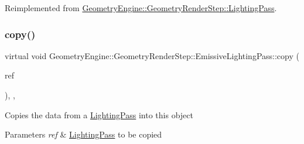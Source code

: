Reimplemented from \mbox{\hyperlink{class_geometry_engine_1_1_geometry_render_step_1_1_lighting_pass_a4f1cb36c7bf6a90d0aa3b8e8feba5e5e}{Geometry\+Engine\+::\+Geometry\+Render\+Step\+::\+Lighting\+Pass}}.

\mbox{\label{class_geometry_engine_1_1_geometry_render_step_1_1_emissive_lighting_pass_a1856a521c04820f16f8f2516c65036d0}} 
\subsubsection{\texorpdfstring{copy()}{copy()}}
{\footnotesize\ttfamily virtual void Geometry\+Engine\+::\+Geometry\+Render\+Step\+::\+Emissive\+Lighting\+Pass\+::copy (\begin{DoxyParamCaption}\item[{const \mbox{\hyperlink{class_geometry_engine_1_1_geometry_render_step_1_1_emissive_lighting_pass}{Emissive\+Lighting\+Pass}} \&}]{ref }\end{DoxyParamCaption})\hspace{0.3cm}{\ttfamily [inline]}, {\ttfamily [protected]}, {\ttfamily [virtual]}}

Copies the data from a \mbox{\hyperlink{class_geometry_engine_1_1_geometry_render_step_1_1_lighting_pass}{Lighting\+Pass}} into this object 
\begin{DoxyParams}{Parameters}
{\em ref} & \mbox{\hyperlink{class_geometry_engine_1_1_geometry_render_step_1_1_lighting_pass}{Lighting\+Pass}} to be copied \\
\hline
\end{DoxyParams}
\mbox{\label{class_geometry_engine_1_1_geometry_render_step_1_1_emissive_lighting_pass_a03eb4da70618421703fc71d61669321d}} 

